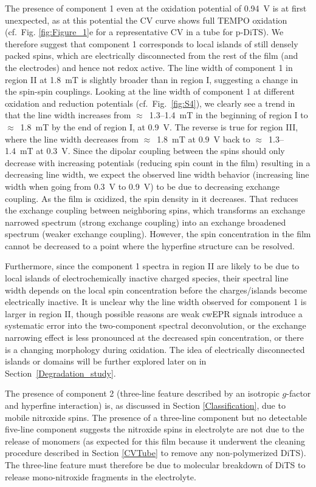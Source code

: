 \par
The presence of component 1 even at the oxidation potential of 0.94~V is at first unexpected, as at this potential the CV curve shows full TEMPO oxidation (cf.\ Fig. \ref{fig:Figure_1}e for a representative CV in a tube for p-DiTS). We therefore suggest that component 1 corresponds to local islands of still densely packed spins, which are electrically disconnected from the rest of the film (and the electrodes) and hence not redox active. The line width of component 1 in region II at 1.8~mT is slightly broader than in region I, suggesting a change in the spin-spin couplings. Looking at the line width of component 1 at different oxidation and reduction potentials (cf.\ Fig.~\ref{fig:S4}), we clearly see a trend in that the line width increases from $\approx$~1.3--1.4~mT in the beginning of region I to $\approx$~1.8~mT by the end of region I, at 0.9~V. The reverse is true for region III, where the line width decreases from $\approx$~1.8~mT at 0.9~V back to $\approx$~1.3--1.4~mT at 0.3~V. Since the dipolar coupling between the spins should only decrease with increasing potentials (reducing spin count in the film) resulting in a decreasing line width, we expect the observed line width behavior (increasing line width when going from 0.3~V to 0.9~V) to be due to decreasing exchange coupling. As the film is oxidized, the spin density in it decreases. That reduces the exchange coupling between neighboring spins, which transforms an exchange narrowed spectrum (strong exchange coupling) into an exchange broadened spectrum (weaker exchange coupling). However, the spin concentration in the film cannot be decreased to a point where the hyperfine structure can be resolved.

\par
Furthermore, since the component 1 spectra in region II are likely to be due to local islands of electrochemically inactive charged species, their spectral line width depends on the local spin concentration before the charges/islands become electrically inactive. It is unclear why the line width observed for component 1 is larger in region II, though possible reasons are weak cwEPR signals introduce a systematic error into the two-component spectral deconvolution, or the exchange narrowing effect is less pronounced at the decreased spin concentration, or there is a changing morphology during oxidation. The idea of electrically disconnected islands or domains will be further explored later on in Section~\ref{Degradation_study}.

\par
The presence of component 2 (three-line feature described by an isotropic $g$-factor and hyperfine interaction) is, as discussed in Section \ref{Classification}, due to mobile nitroxide spins. The presence of a three-line component but no detectable five-line component suggests the nitroxide spins in electrolyte are not due to the release of monomers (as expected for this film because it underwent the cleaning procedure described in Section \ref{CVTube} to remove any non-polymerized DiTS). The three-line feature must therefore be due to molecular breakdown of DiTS to release mono-nitroxide fragments in the electrolyte.

